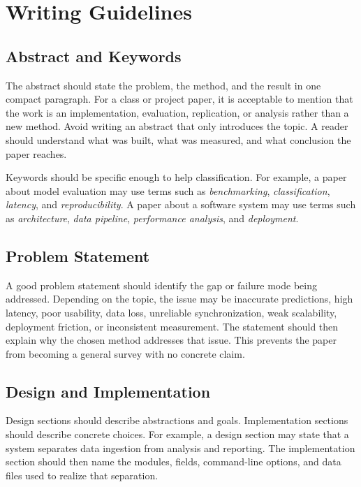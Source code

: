 \section{Writing Guidelines}

\subsection{Abstract and Keywords}

The abstract should state the problem, the method, and the result in one compact paragraph. For a class or project paper, it is acceptable to mention that the work is an implementation, evaluation, replication, or analysis rather than a new method. Avoid writing an abstract that only introduces the topic. A reader should understand what was built, what was measured, and what conclusion the paper reaches.

Keywords should be specific enough to help classification. For example, a paper about model evaluation may use terms such as \textit{benchmarking}, \textit{classification}, \textit{latency}, and \textit{reproducibility}. A paper about a software system may use terms such as \textit{architecture}, \textit{data pipeline}, \textit{performance analysis}, and \textit{deployment}.

\subsection{Problem Statement}

A good problem statement should identify the gap or failure mode being addressed. Depending on the topic, the issue may be inaccurate predictions, high latency, poor usability, data loss, unreliable synchronization, weak scalability, deployment friction, or inconsistent measurement. The statement should then explain why the chosen method addresses that issue. This prevents the paper from becoming a general survey with no concrete claim.

\subsection{Design and Implementation}

Design sections should describe abstractions and goals. Implementation sections should describe concrete choices. For example, a design section may state that a system separates data ingestion from analysis and reporting. The implementation section should then name the modules, fields, command-line options, and data files used to realize that separation.


